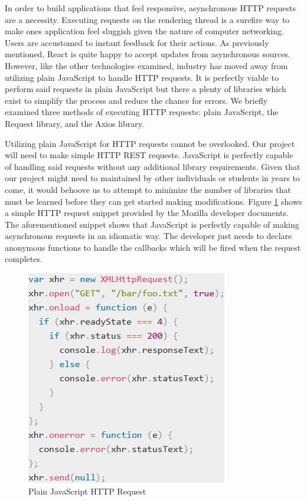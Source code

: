 \documentclass[12pt]{article}
\begin{document}
In order to build applications that feel responsive, asynchronous HTTP requests are a necessity. Executing requests on the rendering thread is a surefire way to make ones application feel sluggish given the nature of computer networking. Users are accustomed to instant feedback for their actions. As previously mentioned, React is quite happy to accept updates from asynchronous sources. However, like the other technologies examined, industry has moved away from utilizing plain JavaScript to handle HTTP requests. It is perfectly viable to perform said requests in plain JavaScript but there a plenty of libraries which exist to simplify the process and reduce the chance for errors. We briefly examined three methods of executing HTTP requests: plain JavaScript, the Request library, and the Axios library.

Utilizing plain JavaScript for HTTP requests cannot be overlooked. Our project will need to make simple HTTP REST requests. JavaScript is perfectly capable of handling said requests without any additional library requirements. Given that our project might need to maintained by other individuals or students in years to come, it would behoove us to attempt to minimize the number of libraries that must be learned before they can get started making modifications. Figure \ref{fig:javascripthttprequest} shows a simple HTTP request snippet provided by the Mozilla developer documents.\cite{mozillahttprequest} The aforementioned snippet shows that JavaScript is perfectly capable of making asynchronous requests in an idiomatic way. The developer just needs to declare anonymous functions to handle the callbacks which will be fired when the request completes.

\begin{figure}[h]
	\centering
	\includegraphics[scale=0.7]{javascript_http_request}
	\caption{Plain JavaScript HTTP Request}
	\label{fig:javascripthttprequest}
\end{figure}
\end{document}
